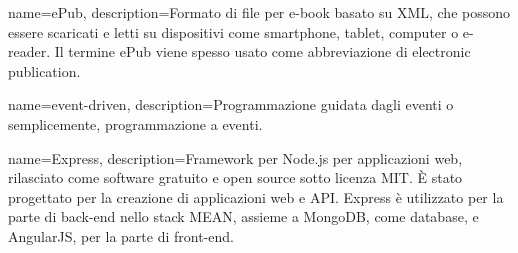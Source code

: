 \hypertarget{E}{}

{
	name=ePub,
	description={Formato di file per e-book basato su XML, che possono essere scaricati e letti su dispositivi come smartphone, tablet, computer o e-reader. Il termine ePub viene spesso usato come abbreviazione di electronic publication.}
}

{
	name=event-driven,
	description={Programmazione guidata dagli eventi o semplicemente, programmazione a eventi.}
}

{
	name=Express,
	description={Framework per Node.js per applicazioni web, rilasciato come software gratuito e open source sotto licenza MIT. È stato progettato per la creazione di applicazioni web e API. Express è utilizzato per la parte di back-end nello stack MEAN, assieme a MongoDB, come database, e AngularJS, per la parte di front-end.}
}